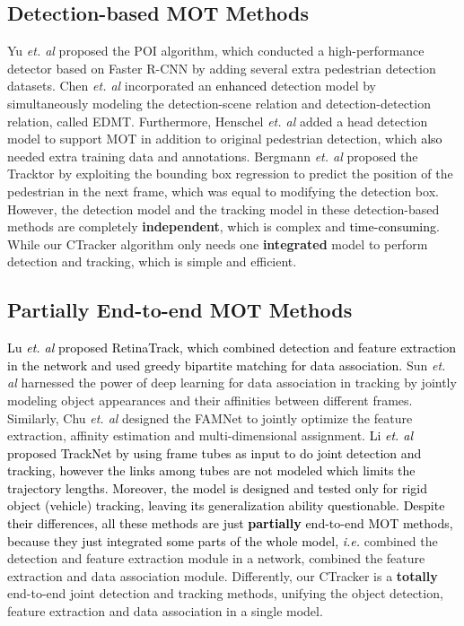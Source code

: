 \documentclass[../arXiv_main.tex]{subfiles}
\newcommand\wfb[1]{\textcolor{black}{#1}}
\newcommand\CRpjl[1]{\textcolor{black}{#1}}
\newcommand\CRwfb[1]{\textcolor{black}{#1}}
\newcommand{\CRyang}[1]{\textcolor{black}{#1}}
\begin{document}
\subsection{Detection-based MOT Methods}

Yu \textit{et. al} \cite{yu2016poi} proposed the POI algorithm, which conducted a high-performance detector based on Faster R-CNN \cite{ren2015faster} by adding several extra pedestrian detection datasets. Chen \textit{et. al} \cite{chen2017enhancing} incorporated an \wfb{enhanced} detection model by simultaneously modeling the detection-scene relation and detection-detection relation, called EDMT. Furthermore, Henschel \textit{et. al} \cite{Henschel2017} added a head detection model to support MOT in addition to original pedestrian detection, which \wfb{also} needed extra training data and annotations. Bergmann \textit{et. al} \cite{bergmann2019tracking} proposed the Tracktor by exploiting the bounding box regression to predict the position of the pedestrian in the next frame, which was equal to modifying the detection box. However, the detection model and the tracking model in these detection-based methods are completely \textbf{independent}, which is complex and \wfb{time-consuming}. While our CTracker algorithm only needs one \textbf{integrated} model to perform detection and tracking, which is simple and efficient. 



\subsection{Partially End-to-end MOT Methods}

\CRpjl{Lu \textit{et. al} \cite{lu2020retinatrack} proposed RetinaTrack, which combined detection and feature extraction in the network and used greedy bipartite matching \CRwfb{for} data association.} Sun \textit{et. al} \cite{sun2019deep} harnessed the power of deep learning for data association in tracking by jointly modeling object appearances and their affinities between different frames. Similarly, Chu \textit{et. al} \cite{chu2019famnet} designed the FAMNet to jointly optimize the feature extraction, affinity estimation and multi-dimensional assignment. \CRpjl{Li \textit{et. al} \cite{li2019tracknet} proposed TrackNet by \CRyang{using frame tubes as input to do joint detection and tracking, however the links among tubes are not modeled which limits the trajectory lengths. Moreover, the model is designed and tested only for rigid object (vehicle) tracking, leaving its generalization ability questionable.}} \wfb{\CRyang{Despite their differences}, all these methods are just \textbf{partially} end-to-end MOT methods, because they just integrated some parts of the whole model, \textit{i.e. } }\cite{lu2020retinatrack} combined the detection and feature extraction module in a network, \cite{sun2019deep,chu2019famnet} combined the feature extraction and data association module. Differently, our CTracker is a \textbf{totally} end-to-end joint detection and tracking methods, unifying the object detection, feature extraction and data association in a single model.
\end{document}
